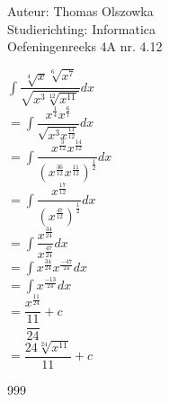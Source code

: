 \documentclass[a4paper]{article}
\newcommand{\dint}{\displaystyle\int}
\newcommand{\fourtroot}{\sqrt[4]}
\newcommand{\sixthroot}{\sqrt[6]}
\newcommand{\twelfthroot}{\sqrt[12]}
\newcommand{\twentyfourthroot}{\sqrt[24]}
\begin{document}
\noindent \large Auteur: Thomas Olszowka \\
\noindent \large Studierichting: Informatica \\
\noindent \large Oefeningenreeks 4A nr. 4.12  \\



\medskip

\normalsize

$\dint \dfrac{\fourtroot{x} \sixthroot{x^7}}{\sqrt{x^3 \twelfthroot{x^{11}}}} dx$ \\

$= \dint \dfrac{x^{\tfrac{1}{4}} x^{\tfrac{6}{7}}}{\sqrt{x^3 x^{\tfrac{11}{12}}}} dx$ \\

$= \dint \dfrac{x^{\tfrac{3}{12}} x^{\tfrac{14}{12}}}{\left( x^{\tfrac{36}{12}} x^{\tfrac{11}{12}}\right)^{\tfrac{1}{2}}} dx$ \\

$= \dint \dfrac{x^{\tfrac{17}{12}}}{\left( x^{\tfrac{47}{12}} \right)^{\tfrac{1}{2}}} dx$ \\

$= \dint \dfrac{x^{\tfrac{34}{24}}}{x^{\tfrac{47}{24}}} dx$ \\

$= \dint x^{\tfrac{34}{24}} x^{\tfrac{-47}{24}} dx$ \\

$= \dint x^{\tfrac{-13}{24}}dx$ \\

$= \dfrac{x^{\tfrac{11}{24}}}{\dfrac{11}{24}} + c$ \\

$= \dfrac{24 \twentyfourthroot{x^{11}}}{11} + c$ \\

\begin{thebibliography}{999}
\end{thebibliography}
\end{document}
